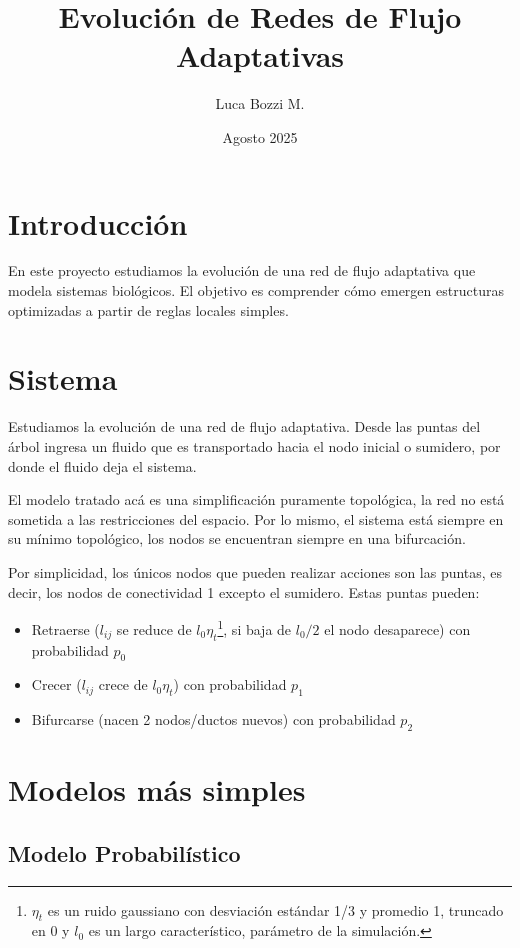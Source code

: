 \documentclass{article}
\title{Evolución de Redes de Flujo Adaptativas}
\author{Luca Bozzi M.}
\date{Agosto 2025}
\begin{document}
\maketitle

\section{Introducción}

En este proyecto estudiamos la evolución de una red de flujo adaptativa que modela sistemas biológicos. El objetivo es comprender cómo emergen estructuras optimizadas a partir de reglas locales simples.

\section{Sistema}

Estudiamos la evolución de una red de flujo adaptativa. Desde las puntas del árbol ingresa un fluido que es transportado hacia el nodo inicial o sumidero, por donde el fluido deja el sistema.

El modelo tratado acá es una simplificación puramente topológica, la red no está sometida a las restricciones del espacio. Por lo mismo, el sistema está siempre en su mínimo topológico, los nodos se encuentran siempre en una bifurcación.

Por simplicidad, los únicos nodos que pueden realizar acciones son las puntas, es decir, los nodos de conectividad 1 excepto el sumidero. Estas puntas pueden:

\begin{itemize}
    \item Retraerse ($l_{ij}$ se reduce de $l_0 \eta_t$\footnote{$\eta_t$ es un ruido gaussiano con desviación estándar 1/3 y promedio 1, truncado en 0 y $l_0$ es un largo característico, parámetro de la simulación.}, si baja de $l_0/2$ el nodo desaparece) con probabilidad $p_0$
    \item Crecer ($l_{ij}$ crece de $l_0\eta_t$) con probabilidad $p_1$
    \item Bifurcarse (nacen 2 nodos/ductos nuevos) con probabilidad $p_2$
\end{itemize} 

\section{Modelos más simples}

\subsection{Modelo Probabilístico}
\end{document}
